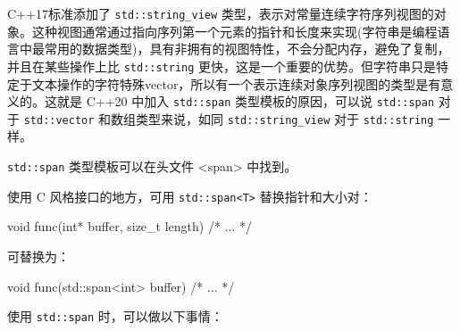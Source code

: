 
 C++17标准添加了 \verb|std::string_view| 类型，表示对常量连续字符序列视图的对象。这种视图通常通过指向序列第一个元素的指针和长度来实现(字符串是编程语言中最常用的数据类型)，具有非拥有的视图特性，不会分配内存，避免了复制，并且在某些操作上比 \verb|std::string| 更快，这是一个重要的优势。但字符串只是特定于文本操作的字符特殊vector，所以有一个表示连续对象序列视图的类型是有意义的。这就是 C++20 中加入 \verb|std::span| 类型模板的原因，可以说 \verb|std::span| 对于 \verb|std::vector| 和数组类型来说，如同 \verb|std::string_view| 对于 \verb|std::string| 一样。


\verb|std::span| 类型模板可以在头文件 <span> 中找到。


使用 C 风格接口的地方，可用 \verb|std::span<T>| 替换指针和大小对：

\begin{cpp}
void func(int* buffer, size_t length) { /* ... */ }
\end{cpp}

可替换为：

\begin{cpp}
void func(std::span<int> buffer) { /* ... */ }
\end{cpp}

使用 \verb|std::span| 时，可以做以下事情：

